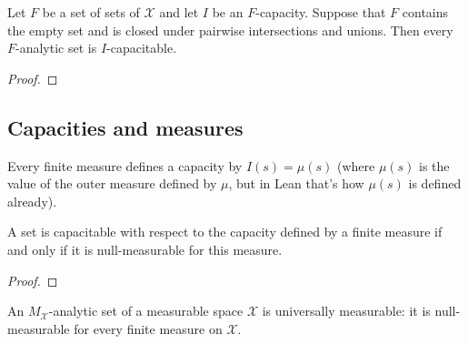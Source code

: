 \begin{theorem}\label{thm:IsPavingAnalytic.isCapacitable}
  \leanok
Let $F$ be a set of sets of $\mathcal{X}$ and let $I$ be an $F$-capacity.
Suppose that $F$ contains the empty set and is closed under pairwise intersections and unions.
Then every $F$-analytic set is $I$-capacitable.
\end{theorem}

\begin{proof}\leanok

\end{proof}



\subsection{Capacities and measures}


\begin{definition}\label{def:Measure.capacity}
  \leanok
Every finite measure defines a capacity by $I(s) = \mu(s)$ (where $\mu(s)$ is the value of the outer measure defined by $\mu$, but in Lean that's how $\mu(s)$ is defined already).
\end{definition}


\begin{lemma}\label{lem:isCapacitable_measure_iff}
  \leanok
A set is capacitable with respect to the capacity defined by a finite measure if and only if it is null-measurable for this measure.
\end{lemma}

\begin{proof}\leanok

\end{proof}


\begin{lemma}\label{lem:IsPavingAnalytic.nullMeasurableSet}
  \leanok
An $M_{\mathcal{X}}$-analytic set of a measurable space $\mathcal{X}$ is universally measurable: it is null-measurable for every finite measure on $\mathcal{X}$.
\end{lemma}

